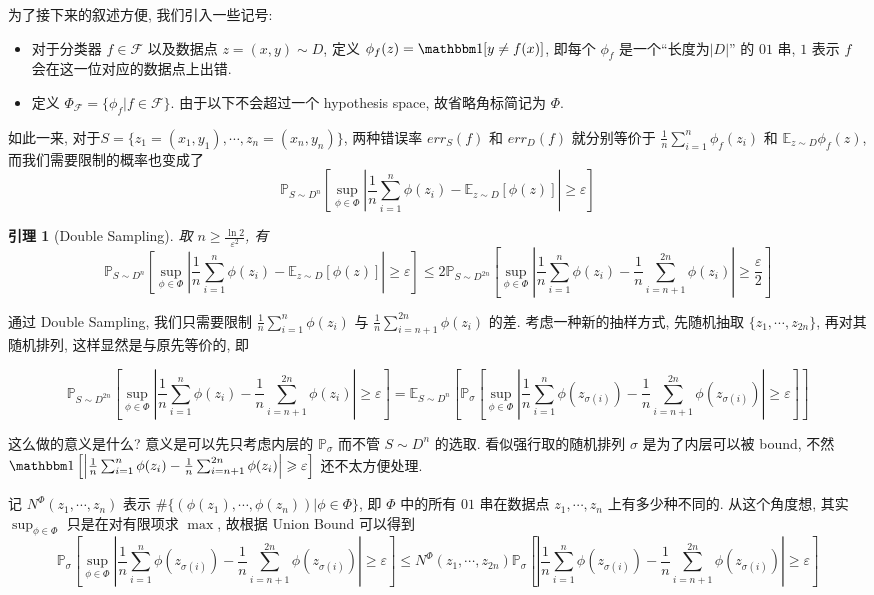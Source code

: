 \documentclass[8pt]{article}
\theoremstyle{compact}
\newtheorem{lemma}[theorem]{引理}
\def\le{\leqslant}
\def\ge{\geqslant}
\begin{document}
为了接下来的叙述方便, 我们引入一些记号:
\begin{itemize}
	\item 对于分类器 $f \in \mathcal F$ 以及数据点 $z = (x, y) \sim D$, 定义 $\phi_f(z) = \mathbbm 1[y \neq f(x)]$, 即每个 $\phi_f$ 是一个“长度为$|D|$” 的 $01$ 串, $1$ 表示 $f$ 会在这一位对应的数据点上出错.
	\item 定义 $\Phi_{\mathcal F} = \{\phi_f | f \in \mathcal F\}$. 由于以下不会超过一个 hypothesis space, 故省略角标简记为 $\Phi$.
\end{itemize}

如此一来, 对于$S = \{z_1 = (x_1, y_1), \cdots, z_n = (x_n, y_n)\}$, 两种错误率 $err_S(f)$ 和 $err_D(f)$ 就分别等价于 $\frac1n \sum\limits_{i=1}^{n}\phi_f(z_i)$ 和 $\mathbb E_{z \sim D}\phi_f(z)$, 而我们需要限制的概率也变成了 $$\mathbb P_{S \sim D^n}\left[\sup_{\phi \in \Phi}\left|\frac1n\sum_{i=1}^{n}\phi(z_i) - \mathbb E_{z \sim D}[\phi(z)]\right| \ge \varepsilon\right]$$

\begin{lemma}[Double Sampling]
	取 $n \ge \frac{\ln 2}{\varepsilon^2}$, 有
	$$\mathbb P_{S \sim D^n}\left[\sup_{\phi \in \Phi}\left|\frac1n\sum_{i=1}^{n}\phi(z_i) - \mathbb E_{z \sim D}[\phi(z)]\right| \ge \varepsilon\right] \le 2\mathbb P_{S \sim D^{2n}}\left[\sup_{\phi \in \Phi}\left|\frac1n\sum_{i=1}^{n}\phi(z_i) - \frac1n\sum_{i=n+1}^{2n}\phi(z_i)\right| \ge \frac{\varepsilon}{2}\right]$$
\end{lemma}

通过 Double Sampling, 我们只需要限制 $\frac1n\sum\limits_{i=1}^{n}\phi(z_i)$ 与 $\frac1n\sum\limits_{i=n+1}^{2n}\phi(z_i)$ 的差. 考虑一种新的抽样方式, 先随机抽取 $\{z_1, \cdots, z_{2n}\}$, 再对其随机排列, 这样显然是与原先等价的, 即

$$\mathbb P_{S \sim D^{2n}}\left[\sup_{\phi \in \Phi}\left|\frac1n\sum_{i=1}^{n}\phi(z_i) - \frac1n\sum_{i=n+1}^{2n}\phi(z_i)\right| \ge \varepsilon\right] = \mathbb E_{S \sim D^n} \left[\mathbb P_{\sigma}\left[\sup_{\phi \in \Phi}\left|\frac1n\sum_{i=1}^{n}\phi(z_{\sigma(i)}) - \frac1n\sum_{i=n+1}^{2n}\phi(z_{\sigma(i)})\right| \ge \varepsilon\right]\right]$$

这么做的意义是什么? 意义是可以先只考虑内层的 $\mathbb P_{\sigma}$ 而不管 $S \sim D^n$ 的选取. 看似强行取的随机排列 $\sigma$ 是为了内层可以被 bound, 不然 $\mathbbm 1\left[\left|\frac1n\sum_{i=1}^{n}\phi(z_i) - \frac1n\sum_{i=n+1}^{2n}\phi(z_i)\right| \ge \varepsilon \right]$ 还不太方便处理.

记 $N^{\Phi}(z_1, \cdots, z_n)$ 表示 $\#\{(\phi(z_1), \cdots, \phi(z_n)) | \phi \in \Phi\}$, 即 $\Phi$ 中的所有 $01$ 串在数据点 $z_1, \cdots, z_n$ 上有多少种不同的. 从这个角度想, 其实 $\sup_{\phi \in \Phi}$ 只是在对有限项求 $\max$, 故根据 Union Bound 可以得到 $$\mathbb P_{\sigma}\left[\sup_{\phi \in \Phi}\left|\frac1n\sum_{i=1}^{n}\phi(z_{\sigma(i)}) - \frac1n\sum_{i=n+1}^{2n}\phi(z_{\sigma(i)})\right| \ge \varepsilon\right] \le N^{\Phi}(z_1, \cdots, z_{2n})\mathbb P_{\sigma}\left[\left|\frac1n\sum_{i=1}^{n}\phi(z_{\sigma(i)}) - \frac1n\sum_{i=n+1}^{2n}\phi(z_{\sigma(i)})\right| \ge \varepsilon\right]$$
\end{document}
